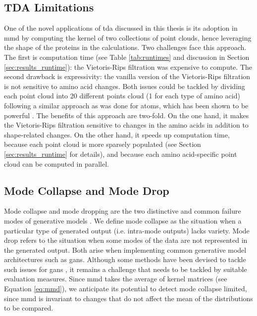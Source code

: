 
\subsection{TDA Limitations}\label{sec:tda_limitations}

One of the novel applications of \acrshort{tda} discussed in this thesis is its adoption in
\acrshort{mmd} by computing the kernel of two collections of point clouds, hence leveraging
the shape of the proteins in the calculations. Two challenges face this
approach. The first is computation time (see Table \ref{tab:runtimes} and
discussion in Section \ref{sec:results_runtime}): the Vietoris-Rips filtration
was expensive to compute. The second drawback is expressivity: the vanilla
version of the Vietoris-Rips filtration is not sensitive to amino acid changes.
Both issues could be tackled by dividing each point cloud into 20 different
points cloud (1 for each type of amino acid) following a similar approach as was
done for atoms, which has been shown to be powerful \cite{jiang2021topological}.
The benefits of this approach are two-fold. On the one hand, it makes the
Vietoris-Rips filtration sensitive to changes in the amino acids in addition to
shape-related changes. On the other hand, it
speeds up computation time, because each point cloud is more sparsely populated
(see Section \ref{sec:results_runtime} for details), and because
each amino acid-specific point cloud can be computed in parallel.


\subsection{Mode Collapse and Mode Drop}

Mode collapse and mode dropping are the two distinctive and common failure modes
of generative models \citep{salimans2016improved}. We define mode collapse as
the situation when a particular type of generated output (i.e. intra-mode
outputs) lacks variety. Mode drop refers to the situation when some modes of the
data are not represented in the generated output. Both arise when implementing
common generative model architectures such as \acrshort{gans}. Although some methods have
been devised to tackle such issues for \acrshort{gans} \citep{arjovsky2017wasserstein,
goodfellow2014generative}, it remains a challenge that needs to be tackled by
suitable evaluation measures. Since \acrshort{mmd} takes the average of kernel matrices
(see Equation \ref{eq:mmd}), we anticipate its potential to detect mode collapse
limited, since \acrshort{mmd} is invariant to changes that do not affect the mean of the
distributions to be compared.

